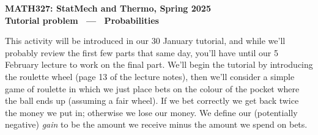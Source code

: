 \documentclass[12 pt]{article} %
\begin{document}
\newcommand{\thisunit}{MATH327 Tutorial (Probabilities)}
\newcommand{\moddate}{Last modified 29 Jan.~2025}
\begin{center}
  {\Large \textbf{MATH327: StatMech and Thermo, Spring 2025}} \\[12 pt]
  {\Large \textbf{Tutorial problem \ --- \ Probabilities}} \\[24 pt]
\end{center}

This activity will be introduced in our 30 January tutorial, and while we'll probably review the first few parts that same day, you'll have until our 5 February lecture to work on the final part.
We'll begin the tutorial by introducing the roulette wheel (page 13 of the lecture notes), then we'll consider a simple game of roulette in which we just place bets on the colour of the pocket where the ball ends up (assuming a fair wheel).
If we bet correctly we get back twice the money we put in; otherwise we lose our money.
We define our (potentially negative) \textit{gain} to be the amount we receive minus the amount we spend on bets. \\[-20 pt]
\end{document}
